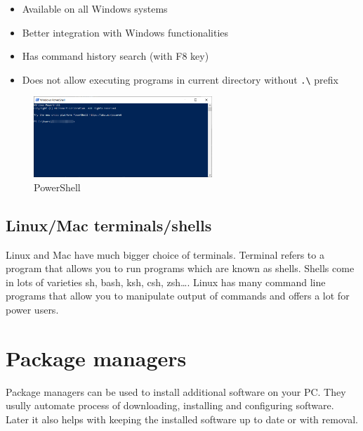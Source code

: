 \documentclass[lang=en,color=green]{elegantbook}
\begin{document}
\noindent\begin{minipage}[t]{0.5\textwidth}%
    \begin{itemize}[leftmargin=*]
        \item Available on all Windows systems
        \item Better integration with Windows functionalities
        \item Has command history search (with F8 key)
    \end{itemize}
\end{minipage}%
\begin{minipage}[t]{0.5\textwidth}%
    \begin{itemize}[leftmargin=*]
        \item  Does not allow executing programs in 
        current directory without  \lstinline{.\} prefix
    \end{itemize}
\end{minipage}%

\begin{figure}[htbp]
    \centering
    \includegraphics[width=0.6\textwidth]{images/powershell.png}
    \caption{PowerShell\label{fig:PowerShell}}
\end{figure}

\subsection{Linux/Mac terminals/shells}

Linux and Mac have much bigger choice of terminals. Terminal refers to a program that allows you to run
programs which are known as shells. Shells come in lots of varieties sh, bash, ksh, csh, zsh\dots. 
Linux has many command line programs that allow you to manipulate output of commands and 
offers a lot for power users.


\section{Package managers} 

Package managers can be used to install additional software on your PC. They usully automate process of 
downloading, installing and configuring software. Later it also helps with keeping the installed software 
up to date or with removal. 
\end{document}

